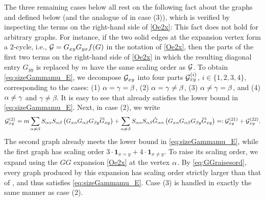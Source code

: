 The three remaining cases below all rest on the following fact about the graphs  and  defined below (and the analogue of  in case (3)), which is verified by inspecting the terms on the right-hand side of \eqref{Oe2x}:
\be\label{eq:GGraisesord}
\ee
This fact does not hold for arbitrary graphs. For instance, if the two solid edges at the expansion vertex form a $2$-cycle, i.e., $\cal G=G_{xy}G_{yx}f(G)$ in the notation of \eqref{Oe2x}, then the parts of the first two terms on the right-hand side of \eqref{Oe2x} in which the resulting diagonal entry $G_{yy}$ is replaced by $m$ have the same scaling order as $\cal G$.
To obtain \eqref{eq:sizeGammamu_E}, we decompose $\cal G_{xy}$ into four parts $\cal G^{(i)}_{xy}$, $i\in\{1,2,3,4\}$, corresponding to the cases: (1) $\al=\gamma=\beta$, (2) $\al=\gamma\ne \beta$, (3) $\al\ne \gamma = \beta$, and (4) $\al\ne \gamma$ and $\gamma\ne \beta$. It is easy to see that  already satisfies the lower bound in \eqref{eq:sizeGammamu_E}. Next, in case (2), we write 
\[ \cal G^{(2)}_{xy}= m\sum_{\al\ne\beta}S_{\al\al}S_{\al\beta} \p{G_{x\al }G_{\al\beta}G_{\beta y}  \overline G_{xy}}+ \sum_{\al\ne\beta}S_{\al\al}S_{\al\beta} \Gc_{\al\al} \p{G_{x\al }G_{\al\beta}G_{\beta y}  \overline G_{xy}}=:\cal G^{(21)}_{xy}+\cal G^{(22)}_{xy}.\]
The second graph  already meets the lower bound in \eqref{eq:sizeGammamu_E}, while the first graph  has scaling order $3\cdot \mathbf 1_{x= y}+4\cdot \mathbf 1_{x\ne y} .$ To raise its scaling order, we expand  using the $GG$ expansion \eqref{Oe2x} at the vertex $\al$. By \eqref{eq:GGraisesord}, every graph produced by this expansion has scaling order strictly larger than that of , and thus satisfies \eqref{eq:sizeGammamu_E}.
Case (3) is handled in exactly the same manner as case (2).
